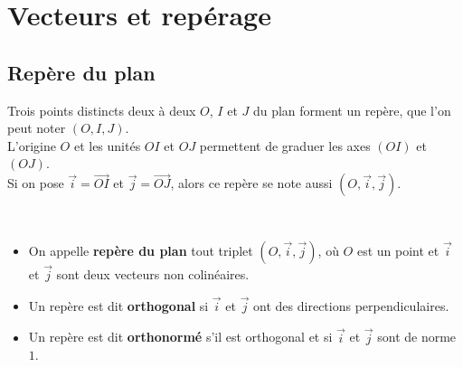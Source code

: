 



\chapter{Vecteurs et repérage}


\section{Repère du plan}
\begin{minipage}[c]{0.65\linewidth}
\noindent Trois points distincts deux à deux $O$, $I$ et $J$ du plan forment un repère, que l'on peut noter $(O,I,J)$.\\
L'origine $O$ et les unités $OI$ et $OJ$ permettent de graduer les axes $(OI)$ et $(OJ)$.\\
Si on pose $\overrightarrow{i}=\overrightarrow{OI}$ et $\overrightarrow{j}=\overrightarrow{OJ}$, alors ce repère se note aussi $(O,\overrightarrow{i},\overrightarrow{j})$.
\end{minipage} \hfill
\begin{minipage}[c]{0.26\linewidth}
\begin{center}
\end{center}
\end{minipage}




\begin{Définition} $ $
\begin{itemize}[label=\textcolor{Couleur6}{$\bullet$}]
\item On appelle {\bf{repère du plan}} tout triplet $(O,\overrightarrow{i},\overrightarrow{j})$, où $O$ est un point et $\overrightarrow{i}$ et $\overrightarrow{j}$ sont deux vecteurs non colinéaires.
\item Un repère est dit {\bf{orthogonal}} si $\overrightarrow{i}$ et $\overrightarrow{j}$ ont des directions perpendiculaires.
\item Un repère est dit {\bf{orthonormé}} s'il est orthogonal et si $\overrightarrow{i}$ et $\overrightarrow{j}$ sont de norme $1$.
\end{itemize}

\end{Définition}

